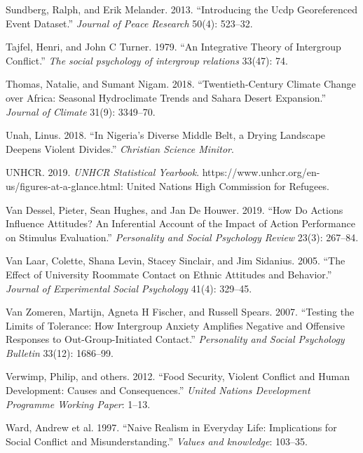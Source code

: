 \documentclass[11pt]{article}
\begin{document}
\leavevmode\hypertarget{ref-ucdp}{}%
Sundberg, Ralph, and Erik Melander. 2013. ``Introducing the Ucdp
Georeferenced Event Dataset.'' \emph{Journal of Peace Research} 50(4):
523--32.

\leavevmode\hypertarget{ref-tajfel1979integrative}{}%
Tajfel, Henri, and John C Turner. 1979. ``An Integrative Theory of
Intergroup Conflict.'' \emph{The social psychology of intergroup
relations} 33(47): 74.

\leavevmode\hypertarget{ref-thomas2018sahara}{}%
Thomas, Natalie, and Sumant Nigam. 2018. ``Twentieth-Century Climate
Change over Africa: Seasonal Hydroclimate Trends and Sahara Desert
Expansion.'' \emph{Journal of Climate} 31(9): 3349--70.

\leavevmode\hypertarget{ref-unah2018nigeria}{}%
Unah, Linus. 2018. ``In Nigeria's Diverse Middle Belt, a Drying
Landscape Deepens Violent Divides.'' \emph{Christian Science Minitor}.

\leavevmode\hypertarget{ref-unhcr2019}{}%
UNHCR. 2019. \emph{UNHCR Statistical Yearbook}.
https://www.unhcr.org/en-us/figures-at-a-glance.html: United Nations
High Commission for Refugees.

\leavevmode\hypertarget{ref-van2019actions}{}%
Van Dessel, Pieter, Sean Hughes, and Jan De Houwer. 2019. ``How Do
Actions Influence Attitudes? An Inferential Account of the Impact of
Action Performance on Stimulus Evaluation.'' \emph{Personality and
Social Psychology Review} 23(3): 267--84.

\leavevmode\hypertarget{ref-van2005effect}{}%
Van Laar, Colette, Shana Levin, Stacey Sinclair, and Jim Sidanius. 2005.
``The Effect of University Roommate Contact on Ethnic Attitudes and
Behavior.'' \emph{Journal of Experimental Social Psychology} 41(4):
329--45.

\leavevmode\hypertarget{ref-van2007testing}{}%
Van Zomeren, Martijn, Agneta H Fischer, and Russell Spears. 2007.
``Testing the Limits of Tolerance: How Intergroup Anxiety Amplifies
Negative and Offensive Responses to Out-Group-Initiated Contact.''
\emph{Personality and Social Psychology Bulletin} 33(12): 1686--99.

\leavevmode\hypertarget{ref-verwimp2012food}{}%
Verwimp, Philip, and others. 2012. ``Food Security, Violent Conflict and
Human Development: Causes and Consequences.'' \emph{United Nations
Development Programme Working Paper}: 1--13.

\leavevmode\hypertarget{ref-ward1997naive}{}%
Ward, Andrew et al. 1997. ``Naive Realism in Everyday Life: Implications
for Social Conflict and Misunderstanding.'' \emph{Values and knowledge}:
103--35.
\end{document}
